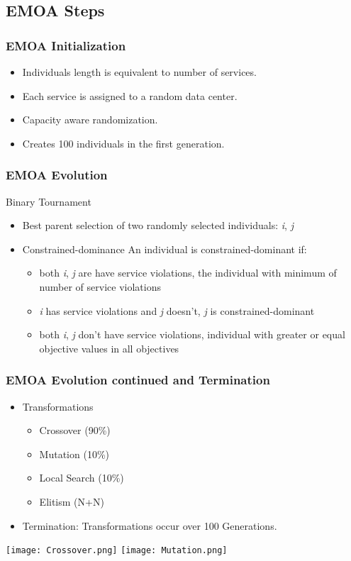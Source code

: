 \documentclass{beamer}
\begin{document}
\subsection{EMOA Steps}
\begin{frame}
\frametitle{EMOA Initialization}
  \begin{itemize}
	\item Individuals length is equivalent to number of services.
	\linebreak
	\linebreak
	\item Each service is assigned to a random data center. 
	\linebreak
	\linebreak
	\item Capacity aware randomization.
	\linebreak
	\linebreak
	\item Creates 100 individuals in the first generation.
  \end{itemize}
\end{frame}

\begin{frame}
	\frametitle{EMOA Evolution}
	Binary Tournament
	\begin{itemize}
		\item Best parent selection of two randomly selected individuals: \emph{i}, \emph{j}
		\item Constrained-dominance 
		\linebreak
		\linebreak
		An individual is constrained-dominant if:
			\begin{itemize}
				\item both \emph{i}, \emph{j} are have service violations, the individual with minimum of number of service violations
				\item \emph{i} has service violations and \emph{j} doesn't, \emph{j} is constrained-dominant
				\item both \emph{i}, \emph{j} don't have service violations, individual with greater or equal objective values in all objectives
			\end{itemize}

	\end{itemize}
\end{frame}

\begin{frame}
\frametitle{EMOA Evolution continued and Termination}
  \begin{itemize}
	\item Transformations
		\begin{itemize}
		\item Crossover (90\%)
		\item Mutation (10\%)
		\item Local Search (10\%)
		\item Elitism (N+N)
		\end{itemize}
	\item Termination: Transformations occur over 100 Generations.
  \end{itemize}
\texttt{[image: Crossover.png]}
\texttt{[image: Mutation.png]}
\end{frame}
\end{document}

